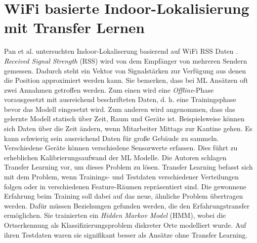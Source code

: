 \section{WiFi basierte Indoor-Lokalisierung mit Transfer Lernen}
Pan et al. untersuchten Indoor-Lokaliserung basierend auf WiFi RSS Daten \cite{pan2008transfer}.
\textit{Received Signal Strength} (RSS) wird von dem Empfänger von mehreren Sendern gemessen.
Dadurch steht ein Vektor von Signalstärken zur Verfügung aus denen die Position approximiert werden kann.
\newline
\newline
Sie bemerken, dass bei ML Ansätzen oft zwei Annahmen getroffen werden.
Zum einen wird eine \textit{Offline}-Phase vorausgesetzt mit ausreichend beschrifteten Daten,
d. h. eine Trainingsphase bevor das Modell eingesetzt wird.
Zum anderen wird angenommen, dass das gelernte Modell statisch über Zeit, Raum und Geräte ist.
\newline
\newline
Beispielsweise können sich Daten über die Zeit ändern, wenn Mitarbeiter Mittags zur Kantine gehen.
Es kann schwierig sein ausreichend Daten für große Gebäude zu sammeln.
Verschiedene Geräte können verschiedene Sensorwerte erfassen.
Dies führt zu erheblichen Kalibrierungsaufwand der ML Modelle.
\newline
\newline
Die Autoren schlagen Transfer Learning vor, um dieses Problem zu lösen.
Transfer Learning befasst sich mit dem Problem, wenn Trainings- und Testdaten verschiedener Verteilungen folgen oder in verschiedenen Feature-Räumen repräsentiert sind.
Die gewonnene Erfahrung beim Training soll dabei auf das neue, ähnliche Problem übertragen werden.
Dafür müssen Beziehungen gefunden werden, die den Erfahrungstransfer ermöglichen.
\newline
\newline
Sie trainierten ein \textit{Hidden Markov Model} (HMM), wobei die Ortserkennung als Klassifizierungsproblem diskreter Orte modelliert wurde.
Auf ihren Testdaten waren sie signifikant besser als Ansätze ohne Transfer Learning.
